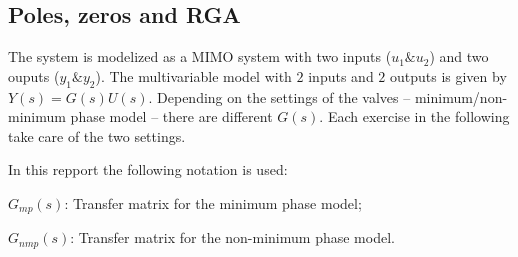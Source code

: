 \subsection{Poles, zeros and RGA}

The system is modelized as a MIMO system with two inputs ($u_1 \& u_2$) and two ouputs ($y_1 \& y_2$).
The multivariable model with $2$ inputs and $2$ outputs is given by $Y(s) = G(s)U(s)$.
Depending on the settings of the valves -- minimum/non-minimum phase model --  there are different $G(s)$.
Each exercise in the following take care of the two settings.

In this repport the following notation is used:

\begin{shortitemize}
    \item $G_{mp}(s)$: Transfer matrix for the minimum phase model;
    \item $G_{nmp}(s)$: Transfer matrix for the non-minimum phase model.
\end{shortitemize}
        






